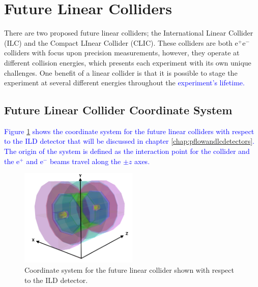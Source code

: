 
\section{Future Linear Colliders}
There are two proposed future linear colliders; the International Linear Collider (ILC) and the Compact LInear Collider (CLIC).  These colliders are both $\text{e}^{+}\text{e}^{-}$ colliders with focus upon precision measurements, however, they operate at different collision energies, which presents each experiment with its own unique challenges.  One benefit of a linear collider is that it is possible to stage the experiment at several different energies throughout the \textcolor{blue}{experiment's lifetime.}


\subsection{Future Linear Collider Coordinate System}

\textcolor{blue}{Figure \ref{fig:coordinates} shows the coordinate system for the future linear colliders with respect to the ILD detector that will be discussed in chapter \ref{chap:pflowandlcdetectors}.  The origin of the system is defined as the interaction point for the collider and the $\text{e}^{+}$ and $\text{e}^{-}$ beams travel along the $\pm z$ axes.}

\begin{figure}[h!]
\includegraphics[width=0.5\textwidth]{Introduction/Plots/CoordinateSystem.png}
\caption[Coordinate system for the future linear collider shown with respect to the ILD detector.]{Coordinate system for the future linear collider shown with respect to the ILD detector.}
\label{fig:coordinates}
\end{figure}

